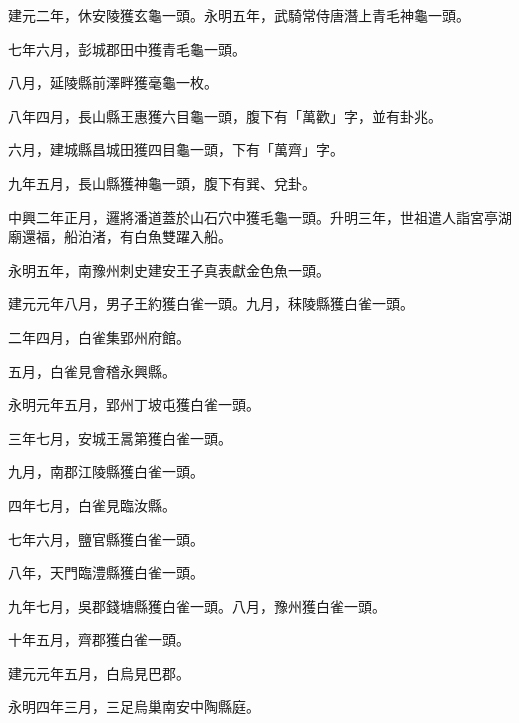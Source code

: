 \begin{pinyinscope}
 建元二年，休安陵獲玄龜一頭。永明五年，武騎常侍唐潛上青毛神龜一頭。



 七年六月，彭城郡田中獲青毛龜一頭。



 八月，延陵縣前澤畔獲毫龜一枚。



 八年四月，長山縣王惠獲六目龜一頭，腹下有「萬歡」字，並有卦兆。



 六月，建城縣昌城田獲四目龜一頭，下有「萬齊」字。



 九年五月，長山縣獲神龜一頭，腹下有巽、兌卦。



 中興二年正月，邏將潘道蓋於山石穴中獲毛龜一頭。升明三年，世祖遣人詣宮亭湖廟還福，船泊渚，有白魚雙躍入船。



 永明五年，南豫州刺史建安王子真表獻金色魚一頭。



 建元元年八月，男子王約獲白雀一頭。九月，秣陵縣獲白雀一頭。



 二年四月，白雀集郢州府館。



 五月，白雀見會稽永興縣。



 永明元年五月，郢州丁坡屯獲白雀一頭。



 三年七月，安城王暠第獲白雀一頭。



 九月，南郡江陵縣獲白雀一頭。



 四年七月，白雀見臨汝縣。



 七年六月，鹽官縣獲白雀一頭。



 八年，天門臨澧縣獲白雀一頭。



 九年七月，吳郡錢塘縣獲白雀一頭。八月，豫州獲白雀一頭。



 十年五月，齊郡獲白雀一頭。



 建元元年五月，白烏見巴郡。



 永明四年三月，三足烏巢南安中陶縣庭。




\end{pinyinscope}
